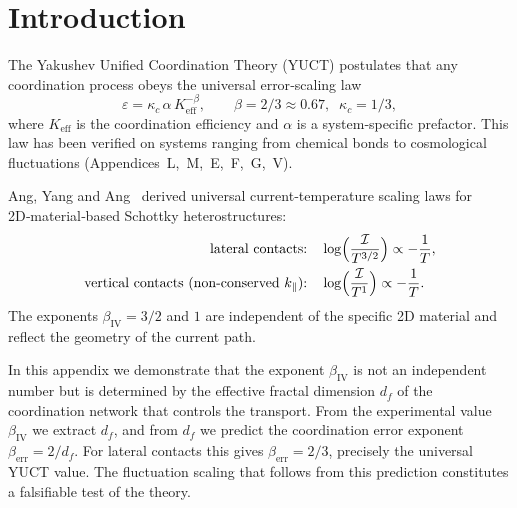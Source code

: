 \documentclass[12pt,a4paper]{article}
\newcommand{\Keff}{K_{\mathrm{eff}}}
\begin{document}
	\tableofcontents
	\newpage
	
	\section{Introduction}
	The Yakushev Unified Coordination Theory (YUCT) postulates that any
	coordination process obeys the universal error‑scaling law
	\begin{equation}
		\varepsilon = \kappa_c \, \alpha \, \Keff^{-\beta},
		\qquad \beta = 2/3 \approx 0.67,\;\; \kappa_c = 1/3,
		\label{eq:yuct-law}
	\end{equation}
	where $\Keff$ is the coordination efficiency and $\alpha$ is a
	system‑specific prefactor. This law has been verified on systems
	ranging from chemical bonds to cosmological fluctuations
	(Appendices~L,~M,~E,~F,~G,~V).
	
	Ang, Yang and Ang~\cite{Ang2018} derived universal current‑temperature
	scaling laws for 2D‑material‑based Schottky heterostructures:
	\begin{align}
		\text{lateral contacts:}&\quad \log\Bigl(\frac{\mathcal{I}}{T^{3/2}}\Bigr) \propto -\frac{1}{T},
		\label{eq:ang-lat}\\
		\text{vertical contacts (non‑conserved $k_\parallel$):}&\quad \log\Bigl(\frac{\mathcal{I}}{T^{1}}\Bigr) \propto -\frac{1}{T}.
		\label{eq:ang-vert}
	\end{align}
	The exponents $\beta_{\mathrm{IV}} = 3/2$ and $1$ are independent of the
	specific 2D material and reflect the geometry of the current path.
	
	In this appendix we demonstrate that the exponent $\beta_{\mathrm{IV}}$
	is not an independent number but is determined by the effective fractal
	dimension $d_f$ of the coordination network that controls the
	transport. From the experimental value $\beta_{\mathrm{IV}}$ we
	extract $d_f$, and from $d_f$ we predict the coordination error
	exponent $\beta_{\mathrm{err}} = 2/d_f$. For lateral contacts this
	gives $\beta_{\mathrm{err}} = 2/3$, precisely the universal YUCT
	value. The fluctuation scaling that follows from this prediction
	constitutes a falsifiable test of the theory.
	
\end{document}

